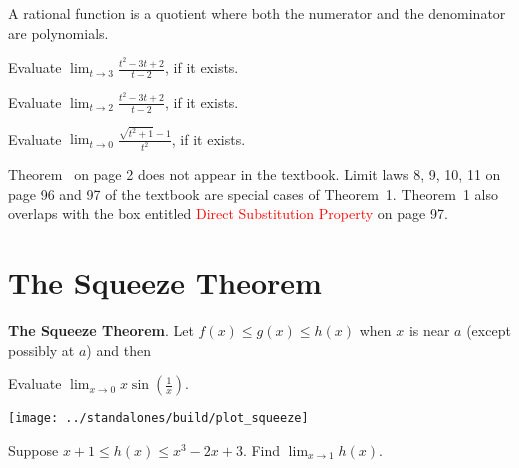 \documentclass[../main.tex]{subfiles}
\begin{document}
A {rational function} is a quotient where both the numerator and the denominator are {polynomials.}

\begin{example}
  Evaluate \(\lim_{t \to 3} \frac{t^{2} - 3t + 2}{t - 2}\), if it exists.
\end{example}

\begin{example}
  Evaluate \(\lim_{t \to 2} \frac{t^{2} - 3t + 2}{t - 2}\), if it exists.
\end{example}
\clearpage

\begin{example}
  Evaluate \(\lim_{t \to 0} \frac{\sqrt{t^{2}+1}-1}{t^{2}}\), if it exists.
\end{example}

\faExclamationTriangle{} Theorem~\faStar{} on page 2 does not appear in the textbook. Limit laws 8, 9, 10, 11 on page 96 and 97 of the textbook are special cases of Theorem~1. Theorem~1 also overlaps with the box entitled \textcolor{red}{Direct Substitution Property} on page 97.

\clearpage

\section{The Squeeze Theorem}
\begin{mdframed}[style=withref]
  \textbf{The Squeeze Theorem}. Let {\(f(x) \le g(x) \le h(x)\)} when \(x\) is near \(a\) (except possibly at \(a\)) and
  then

\end{mdframed}

\begin{example}
  Evaluate \(\lim_{x \to 0} x \sin\left(\frac{1}{x}\right)\).

  \hfill\texttt{[image: ../standalones/build/plot\_squeeze]}
\end{example}
\clearpage

\begin{example}
  Suppose \(x+1 \le h(x) \le x^{3} - 2x + 3\). Find \(\lim_{x \to 1} h(x)\).

\end{example}
\end{document}
